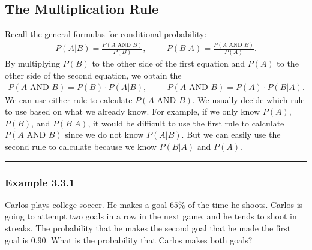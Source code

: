 \documentclass[letterpaper,10pt,english]{jupyterBook}
\begin{document}
\subsection{The Multiplication Rule}
\label{\detokenize{Ch3 Probability/3.3 Multiplication Rules and Independent Events:the-multiplication-rule}}
\sphinxAtStartPar
Recall the general formulas for conditional probability:
\begin{equation*}
\begin{split}P(A|B) = \frac{P(A\text{ AND }B)}{P(B)}, \hspace{1cm} P(B|A) = \frac{P(A\text{ AND }B)}{P(A)}.\end{split}
\end{equation*}
\sphinxAtStartPar
By multiplying \(P(B)\) to the other side of the first equation and \(P(A)\) to the other side of the second equation, we obtain the 
\begin{equation*}
\begin{split}
P(A \text{ AND } B) = P(B) \cdot P(A|B), \hspace{1cm} P(A \text{ AND } B) = P(A) \cdot P(B|A).
\end{split}
\end{equation*}
\sphinxAtStartPar
We can use either rule to calculate \(P(A\text{ AND }B)\). We usually decide which rule to use based on what we already know. For example, if we only know \(P(A)\), \(P(B)\), and \(P(B|A)\), it would be difficult to use the first rule to calculate \(P(A \text{ AND } B)\) since we do not know \(P(A|B)\). But we can easily use the second rule to calculate because we know \(P(B|A)\) and \(P(A)\).


\bigskip\hrule\bigskip



\subsubsection{Example 3.3.1}
\label{\detokenize{Ch3 Probability/3.3 Multiplication Rules and Independent Events:example-3-3-1}}
\sphinxAtStartPar
Carlos plays college soccer. He makes a goal \(65\%\) of the time he shoots. Carlos is going to attempt two goals in a row in the next game, and he tends to shoot in streaks. The probability that he makes the second goal  that he made the first goal is \(0.90\). What is the probability that Carlos makes both goals?
\end{document}

